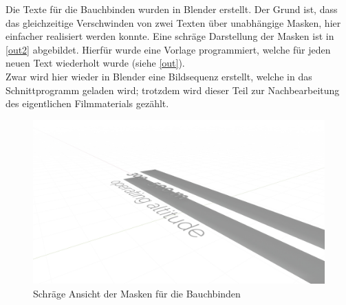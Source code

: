 Die Texte für die Bauchbinden wurden in Blender erstellt. Der Grund ist, dass das gleichzeitige Verschwinden von zwei Texten über unabhängige Masken, hier einfacher realisiert werden konnte. Eine schräge Darstellung der Masken ist in \autoref{out2} abgebildet. Hierfür wurde eine Vorlage programmiert, welche für jeden neuen Text wiederholt wurde (siehe \autoref{out}).\\
Zwar wird hier wieder in Blender eine Bildsequenz erstellt, welche in das Schnittprogramm geladen wird; trotzdem wird dieser Teil zur Nachbearbeitung des eigentlichen Filmmaterials gezählt.

\begin{figure}[H]
\begin{center}
\includegraphics[width=\textwidth]{gfx/post/call-out2.jpg}
\caption{Schräge Ansicht der Masken für die Bauchbinden}
\label{out2}
\end{center}
\end{figure}
%
